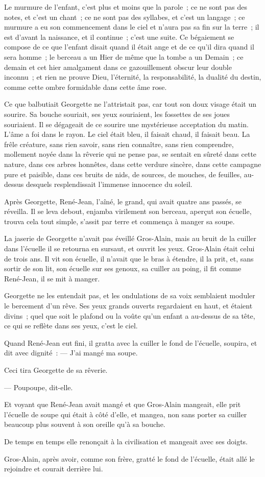 \documentclass[french,twoside]{book} %
\begin{document}
Le murmure de l’enfant, c’est plus et moins que la parole ; ce ne sont pas des notes, et c’est un chant ; ce ne sont pas des syllabes, et c’est un langage ; ce murmure a eu son commencement dans le ciel et n’aura pas sa fin sur la terre ; il est d’avant la naissance, et il continue ; c’est une suite. Ce bégaiement se compose de ce que l’enfant disait quand il était ange et de ce qu’il dira quand il sera homme ; le berceau a un Hier de même que la tombe a un Demain ; ce demain et cet hier amalgament dans ce gazouillement obscur leur double inconnu ; et rien ne prouve Dieu, l’éternité, la responsabilité, la dualité du destin, comme cette ombre formidable dans cette âme rose.\par
Ce que balbutiait Georgette ne l’attristait pas, car tout son doux visage était un sourire. Sa bouche souriait, ses yeux souriaient, les fossettes de ses joues souriaient. Il se dégageait de ce sourire une mystérieuse acceptation du matin. L’âme a foi dans le rayon. Le ciel était bleu, il faisait chaud, il faisait beau. La frêle créature, sans rien savoir, sans rien connaître, sans rien comprendre, mollement noyée dans la rêverie qui ne pense pas, se sentait en sûreté dans cette  nature, dans ces arbres honnêtes, dans cette verdure sincère, dans cette campagne pure et paisible, dans ces bruits de nids, de sources, de mouches, de feuilles, au-dessus desquels resplendissait l’immense innocence du soleil.\par
Après Georgette, René-Jean, l’aîné, le grand, qui avait quatre ans passés, se réveilla. Il se leva debout, enjamba virilement son berceau, aperçut son écuelle, trouva cela tout simple, s’assit par terre et commença à manger sa soupe.\par
La jaserie de Georgette n’avait pas éveillé Gros-Alain, mais au bruit de la cuiller dans l’écuelle il se retourna en sursaut, et ouvrit les yeux. Gros-Alain était celui de trois ans. Il vit son écuelle, il n’avait que le bras à étendre, il la prit, et, sans sortir de son lit, son écuelle sur ses genoux, sa cuiller au poing, il fit comme René-Jean, il se mit à manger.\par
Georgette ne les entendait pas, et les ondulations de sa voix semblaient moduler le bercement d’un rêve. Ses yeux grands ouverts regardaient en haut, et étaient divins ; quel que soit le plafond ou la voûte qu’un enfant a au-dessus de sa tête, ce qui se reflète dans ses yeux, c’est le ciel.\par
Quand René-Jean eut fini, il gratta avec la cuiller le fond de l’écuelle, soupira, et dit avec dignité : — J’ai mangé ma soupe.\par
Ceci tira Georgette de sa rêverie.\par
— Poupoupe, dit-elle.\par
Et voyant que René-Jean avait mangé et que Gros-Alain mangeait, elle prit l’écuelle de soupe qui était à  côté d’elle, et mangea, non sans porter sa cuiller beaucoup plus souvent à son oreille qu’à sa bouche.\par
De temps en temps elle renonçait à la civilisation et mangeait avec ses doigts.\par
Gros-Alain, après avoir, comme son frère, gratté le fond de l’écuelle, était allé le rejoindre et courait derrière lui.
\end{document}
